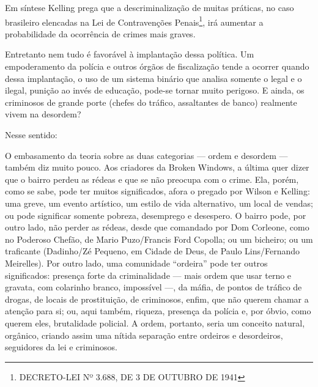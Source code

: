 \documentclass[
	12pt,				%
	openright,			%
	twoside,			%
	a4paper,			%
	chapter=TITLE,		%
	section=TITLE,		%
	subsection=TITLE,	%
	subsubsection=TITLE,%
	spanish,            %
	english,			%
	brazil				%
	]{abntex2}
\begin{document}
\par
Em síntese Kelling prega que a descriminalização de muitas práticas, no caso brasileiro elencadas na Lei de Contravenções Penais\footnote{DECRETO-LEI Nº 3.688, DE 3 DE OUTUBRO DE 1941}, irá aumentar a probabilidade da ocorrência de crimes mais graves. 
\par
Entretanto nem tudo é favorável à implantação dessa política. Um empoderamento da polícia e outros órgãos de fiscalização tende a ocorrer
quando dessa implantação, o uso de um sistema binário que analisa somente o legal e o ilegal, punição ao invés de educação, pode-se tornar muito perigoso. E ainda, os criminosos de grande porte (chefes do tráfico, assaltantes de banco) realmente vivem na desordem? 
\par
Nesse sentido: 
\begin{citacao}
O embasamento da teoria sobre as duas categorias — ordem e desordem —
também diz muito pouco. Aos criadores da Broken Windows, a última quer
dizer que o bairro perdeu as rédeas e que se não preocupa com o crime. Ela,
porém, como se sabe, pode ter muitos significados, afora o pregado por
Wilson e Kelling: uma greve, um evento artístico, um estilo de vida
alternativo, um local de vendas; ou pode significar somente pobreza,
desemprego e desespero. O bairro pode, por outro lado, não perder as
rédeas, desde que comandado por Dom Corleone, como no Poderoso
Chefão, de Mario Puzo/Francis Ford Copolla; ou um bicheiro; ou um
traficante (Dadinho/Zé Pequeno,	em Cidade de Deus, de Paulo
Lins/Fernando Meirelles).
Por outro lado, uma comunidade “ordeira” pode ter outros significados:
presença forte da criminalidade — mais ordem que usar terno e gravata,
com colarinho branco, impossível —, da máfia, de pontos de tráfico de
drogas, de locais de prostituição, de criminosos, enfim, que não querem
chamar a atenção para si; ou, aqui também, riqueza, presença da polícia e,
por óbvio, como querem eles, brutalidade policial.
A ordem, portanto, seria um conceito natural, orgânico, criando assim uma
nítida separação entre ordeiros e desordeiros, seguidores da lei e
criminosos.\cite{Coutinho}
\end{citacao}
\end{document}
